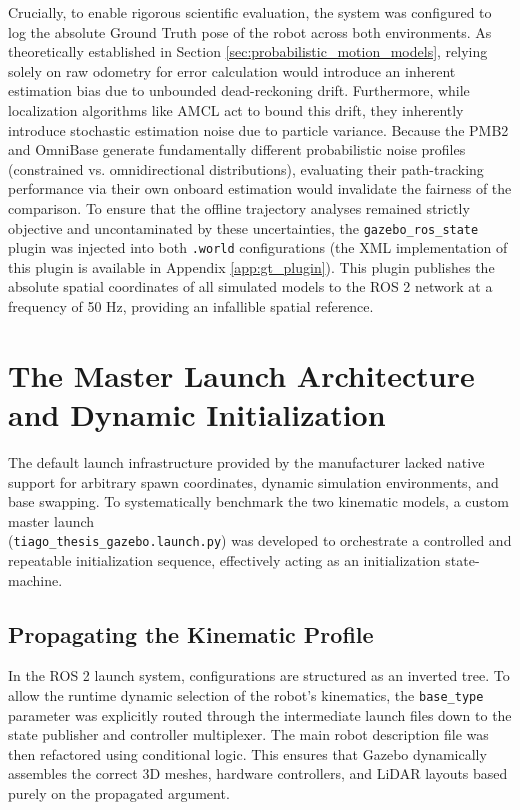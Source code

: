 Crucially, to enable rigorous scientific evaluation, the system was configured to log the absolute Ground Truth pose of the robot across both environments. As theoretically established in Section \ref{sec:probabilistic_motion_models}, relying solely on raw odometry for error calculation would introduce an inherent estimation bias due to unbounded dead-reckoning drift. Furthermore, while localization algorithms like AMCL act to bound this drift, they inherently introduce stochastic estimation noise due to particle variance. Because the PMB2 and OmniBase generate fundamentally different probabilistic noise profiles (constrained vs. omnidirectional distributions), evaluating their path-tracking performance via their own onboard estimation would invalidate the fairness of the comparison. To ensure that the offline trajectory analyses remained strictly objective and uncontaminated by these uncertainties, the \texttt{gazebo\_ros\_state} plugin was injected into both \texttt{.world} configurations (the XML implementation of this plugin is available in Appendix \ref{app:gt_plugin}). This plugin publishes the absolute spatial coordinates of all simulated models to the ROS 2 network at a frequency of 50 Hz, providing an infallible spatial reference.

\section{The Master Launch Architecture and Dynamic Initialization}
\label{sec:launch arch}

The default launch infrastructure provided by the manufacturer lacked native support for arbitrary spawn coordinates, dynamic simulation environments, and base swapping. To systematically benchmark the two kinematic models, a custom master launch  \\ (\texttt{tiago\_thesis\_gazebo.launch.py}) was developed to orchestrate a controlled and repeatable initialization sequence, effectively acting as an initialization state-machine.

\subsection{Propagating the Kinematic Profile}
In the ROS 2 launch system, configurations are structured as an inverted tree. To allow the runtime dynamic selection of the robot's kinematics, the \texttt{base\_type} parameter was explicitly routed through the intermediate launch files down to the state publisher and controller multiplexer. The main robot description file was then refactored using conditional logic. This ensures that Gazebo dynamically assembles the correct 3D meshes, hardware controllers, and LiDAR layouts based purely on the propagated argument.

